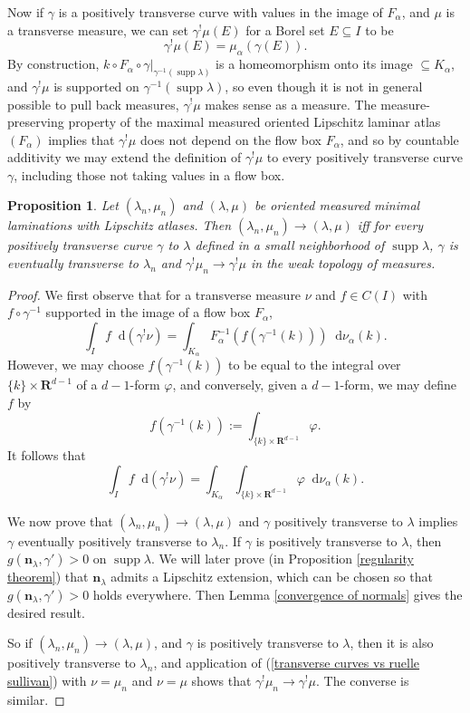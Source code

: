 \documentclass[reqno,11pt]{amsart}
\newcommand{\RR}{\mathbf{R}}
\newcommand*\dif{\mathop{}\!\mathrm{d}}
\DeclareMathOperator{\supp}{supp}
\newcommand{\normal}{\mathbf n}
\newtheorem{proposition}[theorem]{Proposition}
\theoremstyle{definition}
\numberwithin{equation}{section}
\begin{document}
Now if $\gamma$ is a positively transverse curve with values in the image of $F_\alpha$, and $\mu$ is a transverse measure, we can set $\gamma^! \mu(E)$ for a Borel set $E \subseteq I$ to be
$$\gamma^! \mu(E) = \mu_\alpha(\gamma(E)).$$
By construction, $k \circ F_\alpha \circ \gamma|_{\gamma^{-1}(\supp \lambda)}$ is a homeomorphism onto its image $\subseteq K_\alpha$, and $\gamma^! \mu$ is supported on $\gamma^{-1}(\supp \lambda)$, so even though it is not in general possible to pull back measures, $\gamma^! \mu$ makes sense as a measure.
The measure-preserving property of the maximal measured oriented Lipschitz laminar atlas $(F_\alpha)$ implies that $\gamma^! \mu$ does not depend on the flow box $F_\alpha$, and so by countable additivity we may extend the definition of $\gamma^! \mu$ to every positively transverse curve $\gamma$, including those not taking values in a flow box.

\begin{proposition}\label{characterization of measure convergence}
	Let $(\lambda_n, \mu_n)$ and $(\lambda, \mu)$ be oriented measured minimal laminations with Lipschitz atlases. Then $(\lambda_n, \mu_n) \to (\lambda, \mu)$ iff for every positively transverse curve $\gamma$ to $\lambda$ defined in a small neighborhood of $\supp \lambda$, $\gamma$ is eventually transverse to $\lambda_n$ and $\gamma^! \mu_n \to \gamma^! \mu$ in the weak topology of measures.
\end{proposition}
\begin{proof}
	We first observe that for a transverse measure $\nu$ and $f \in C(I)$ with $f \circ \gamma^{-1}$ supported in the image of a flow box $F_\alpha$,
	$$\int_I f \dif(\gamma^! \nu) = \int_{K_\alpha} F_\alpha^{-1}(f(\gamma^{-1}(k))) \dif \nu_\alpha(k).$$
	However, we may choose $f(\gamma^{-1}(k))$ to be equal to the integral over $\{k\} \times \RR^{d - 1}$ of a $d-1$-form $\varphi$, and conversely, given a $d-1$-form, we may define $f$ by
	$$f(\gamma^{-1}(k)) := \int_{\{k\} \times \RR^{d - 1}} \varphi.$$
	It follows that
\begin{equation}\label{transverse curves vs ruelle sullivan}
	\int_I f \dif(\gamma^! \nu) = \int_{K_\alpha} \int_{\{k\} \times \RR^{d - 1}} \varphi \dif \nu_\alpha(k).
\end{equation}

	We now prove that $(\lambda_n, \mu_n) \to (\lambda, \mu)$ and $\gamma$ positively transverse to $\lambda$ implies $\gamma$ eventually positively transverse to $\lambda_n$.
	If $\gamma$ is positively transverse to $\lambda$, then $g(\normal_\lambda, \gamma') > 0$ on $\supp \lambda$.
	We will later prove (in Proposition \ref{regularity theorem}) that $\normal_\lambda$ admits a Lipschitz extension, which can be chosen so that $g(\normal_\lambda, \gamma') > 0$ holds everywhere.
	Then Lemma \ref{convergence of normals} gives the desired result.

	So if $(\lambda_n, \mu_n) \to (\lambda, \mu)$, and $\gamma$ is positively transverse to $\lambda$, then it is also positively transverse to $\lambda_n$, and application of (\ref{transverse curves vs ruelle sullivan}) with $\nu = \mu_n$ and $\nu = \mu$ shows that $\gamma^! \mu_n \to \gamma^! \mu$.
	The converse is similar.
\end{proof}
\end{document}
